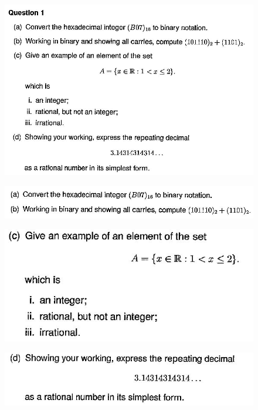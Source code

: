 \documentclass[]{article}
\begin{document}
	
	\newpage
	\begin{figure}[h!]
		\centering 
		\includegraphics[width=1.5\linewidth]{HC-2014-ZA-Q1}     
	\end{figure}
	\newpage
	\begin{figure}[h!]
		\centering 
		
		\includegraphics[width=1.5\linewidth]{HC-2014-ZA-Q1ab}  
	\end{figure}
	\newpage
	\begin{figure}[h!]
		\centering  
		\includegraphics[width=1.5\linewidth]{HC-2014-ZA-Q1c} 
	\end{figure}
	\newpage
	\begin{figure}[h!]
		\centering    
		\includegraphics[width=1.5\linewidth]{HC-2014-ZA-Q1d}
	\end{figure}
\end{document}
